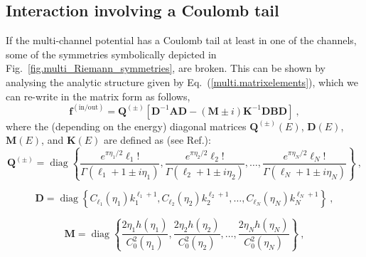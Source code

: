 \documentclass[12pt]{article}
\begin{document}
\subsection{Interaction involving a Coulomb tail}
\label{Appendix.Coulomb}
If the multi-channel potential has a Coulomb tail at least in one of the
channels, some of the symmetries  symbolically depicted in 
Fig.~\ref{fig.multi_Riemann_symmetries}, are broken. 
This can be shown by analysing the analytic structure given by 
Eq.~(\ref{multi.matrixelements}), which we can re-write in the matrix form as 
follows,
\begin{equation}
\label{multi.Finout_structure}
   \bm{f}^{(\mathrm{in/out})}=
   \bm{Q}^{(\pm)}\left[
   \bm{D}^{-1}\bm{A}\bm{D}-(\bm{M}\pm i)
   \bm{K}^{-1}\bm{D}\bm{B}\bm{D}\right]\ ,   
\end{equation}
where the (depending on the energy) diagonal matrices $\bm{Q}^{(\pm)}(E)$,
$\bm{D}(E)$, $\bm{M}(E)$, and $\bm{K}(E)$ are defined as (see 
Ref.\cite{our_Coulomb}):
\begin{equation}
\label{multi.defQ}
   \bm{Q}^{(\pm)} =
   \operatorname{diag}\left\{
   \frac{e^{\pi\eta_1/2}\ell_1!}{\Gamma(\ell_1+1\pm i\eta_1)},
   \frac{e^{\pi\eta_2/2}\ell_2!}{\Gamma(\ell_2+1\pm i\eta_2)},\dots,
   \frac{e^{\pi\eta_N/2}\ell_N!}{\Gamma(\ell_N+1\pm i\eta_N)}\right\}\ ,
\end{equation}

\begin{equation}
\label{multi.defD}
   \bm{D} =
   \operatorname{diag}\left\{
   C_{\ell_1}(\eta_1)k_1^{\ell_1+1},
   C_{\ell_2}(\eta_2)k_2^{\ell_2+1},\dots,
   C_{\ell_N}(\eta_N)k_N^{\ell_N+1}\right\}\ ,
\end{equation}

\begin{equation}
   \bm{M} =
   \operatorname{diag}\left\{
   \frac{2\eta_1h(\eta_1)}{C_0^2(\eta_1)},
   \frac{2\eta_2h(\eta_2)}{C_0^2(\eta_2)},
   \dots,
   \frac{2\eta_Nh(\eta_N)}{C_0^2(\eta_N)}\right\}\ ,
\end{equation}
\end{document}
